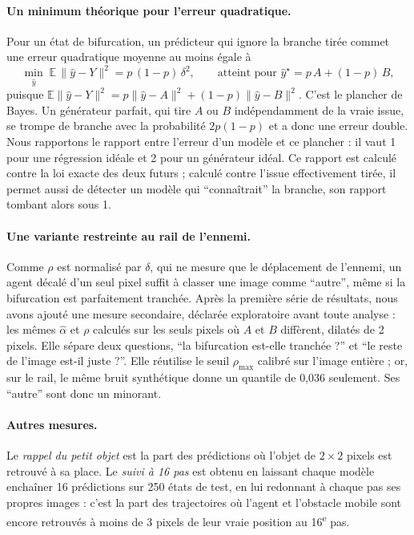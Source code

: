 \documentclass[a4paper, 11pt]{article}
\newcommand{\ahat}{\hat\alpha}
\begin{document}
\paragraph{Un minimum théorique pour l'erreur quadratique.} Pour un état de bifurcation, un prédicteur qui ignore la
branche tirée commet une erreur quadratique moyenne au moins égale à
\begin{equation}
  \min_{\hat y}\; \mathbb E\,\lVert \hat y - Y\rVert^2 = p\,(1-p)\,\delta^2 ,
  \qquad\text{atteint pour } \hat y^\star = p\,A + (1-p)\,B ,
\end{equation}
puisque $\mathbb E\lVert\hat y - Y\rVert^2 = p\lVert \hat y - A\rVert^2 + (1-p)\lVert \hat y - B\rVert^2$. C'est le
plancher de Bayes. Un générateur parfait, qui tire $A$ ou $B$ indépendamment de la vraie issue, se trompe de branche avec la
probabilité $2p(1-p)$ et a donc une erreur double. Nous rapportons le rapport entre l'erreur d'un modèle et ce plancher : il
vaut 1 pour une régression idéale et 2 pour un générateur idéal. Ce rapport est calculé contre la loi exacte des deux
futurs ; calculé contre l'issue effectivement tirée, il permet aussi de détecter un modèle qui \enquote{connaîtrait} la
branche, son rapport tombant alors sous 1.

\paragraph{Une variante restreinte au rail de l'ennemi.} Comme $\rho$ est normalisé par $\delta$, qui ne mesure que le
déplacement de l'ennemi, un agent décalé d'un seul pixel suffit à classer une image comme \enquote{autre}, même si la
bifurcation est parfaitement tranchée. Après la première série de résultats, nous avons ajouté une mesure secondaire, déclarée
exploratoire avant toute analyse : les mêmes $\ahat$ et $\rho$ calculés sur les seuls pixels où $A$ et $B$ diffèrent,
dilatés de 2 pixels. Elle sépare deux questions, \enquote{la bifurcation est-elle tranchée ?} et \enquote{le reste de l'image
est-il juste ?}. Elle réutilise le seuil $\rho_{\max}$ calibré sur l'image entière ; or, sur le rail, le même bruit
synthétique donne un quantile de 0,036 seulement. Ses \enquote{autre} sont donc un minorant.

\paragraph{Autres mesures.} Le \emph{rappel du petit objet} est la part des prédictions où l'objet de $2\times2$ pixels
est retrouvé à sa place. Le \emph{suivi à 16 pas} est obtenu en laissant chaque modèle enchaîner 16 prédictions sur
250 états de test, en lui redonnant à chaque pas ses propres images : c'est la part des trajectoires où l'agent et l'obstacle
mobile sont encore retrouvés à moins de 3 pixels de leur vraie position au 16\textsuperscript{e} pas.
\end{document}
